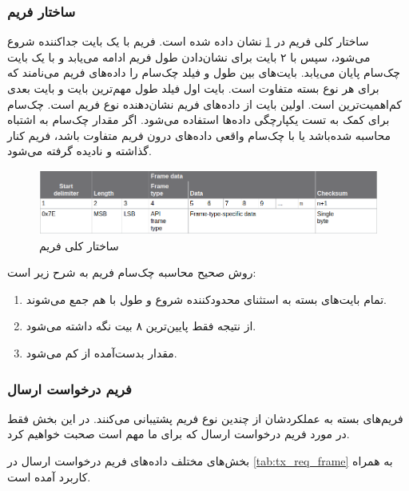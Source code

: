 \subsubsection{ساختار فریم }

ساختار کلی فریم  در \cref{fig:xbee_frame} \cite{Digi} نشان داده شده است. فریم با یک بایت جداکننده شروع می‌شود، سپس با ۲ بایت برای نشان‌دادن طول فریم ادامه می‌یابد و با یک بایت چک‌سام پایان می‌یابد. بایت‌های بین طول و فیلد چک‌سام را داده‌های فریم می‌نامند که برای هر نوع بسته  متفاوت است. بایت اول فیلد طول مهم‌ترین بایت و بایت بعدی کم‌اهمیت‌ترین است. اولین بایت از داده‌های فریم نشان‌دهنده نوع فریم است. چک‌سام برای کمک به تست یکپارچگی داده‌ها استفاده می‌شود. اگر مقدار چک‌سام به اشتباه محاسبه شده‌باشد یا با چک‌سام واقعی داده‌های درون فریم متفاوت باشد، فریم کنار گذاشته و نادیده گرفته می‌شود.


\begin{figure}[!h]
\centering\includegraphics[scale=.65]{xbee_frame.png}
\caption{ساختار کلی فریم  \cite{Digi}}\label{fig:xbee_frame}
\end{figure}

روش صحیح محاسبه چک‌سام فریم به شرح زیر است:
\begin{enumerate}
\item تمام بایت‌های بسته به استثنای محدودکننده شروع و طول با هم جمع می‌شوند.
\item از نتیجه فقط پایین‌ترین ۸ بیت نگه داشته می‌شود.
\item مقدار بدست‌آمده از  کم می‌شود.
\end{enumerate}

\subsubsection{فریم درخواست ارسال} \label{tx_req}

فریم‌های  بسته به عملکردشان از چندین نوع فریم پشتیبانی می‌کنند. در این بخش فقط در مورد فریم درخواست ارسال که برای ما مهم است صحبت خواهیم کرد.

بخش‌های مختلف داده‌های فریم درخواست ارسال در \cref{tab:tx_req_frame} به همراه کاربرد آمده است.

